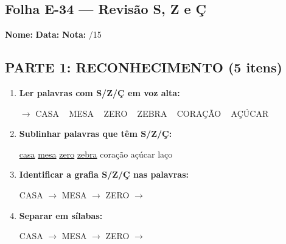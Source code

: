 \subsection{Folha E-34 --- Revisão S, Z e Ç}
\begin{exercicio}



\noindent\textbf{Nome:} \underline{\hspace{3.2cm}} \quad \textbf{Data:} \underline{\hspace{1.6cm}} \quad \textbf{Nota:} \underline{\hspace{0.9cm}}/15


\subsection*{PARTE 1: RECONHECIMENTO (5 itens)}

\begin{enumerate}

  \item \textbf{Ler palavras com S/Z/Ç em voz alta:}
  \begin{center}
  $\rightarrow$ CASA ~ MESA ~ ZERO ~ ZEBRA ~ CORAÇÃO ~ AÇÚCAR
  \end{center}

  \item \textbf{Sublinhar palavras que têm S/Z/Ç:}

\begin{center}
  \uline{casa} \quad \uline{mesa} \quad \uline{zero} \quad \uline{zebra} \quad coração \quad açúcar \quad laço
\end{center}

  \item \textbf{Identificar a grafia S/Z/Ç nas palavras:}
  \begin{center}
  CASA $\rightarrow$ \underline{\hspace{1cm}} \quad MESA $\rightarrow$ \underline{\hspace{1cm}} \quad ZERO $\rightarrow$ \underline{\hspace{1cm}}
  \end{center}

  \item \textbf{Separar em sílabas:}
  \begin{center}
  CASA $\rightarrow$ \underline{\hspace{1.2cm}} \quad MESA $\rightarrow$ \underline{\hspace{1.2cm}} \quad ZERO $\rightarrow$ \underline{\hspace{1.2cm}}
  \end{center}


\end{enumerate}
\end{exercicio}
